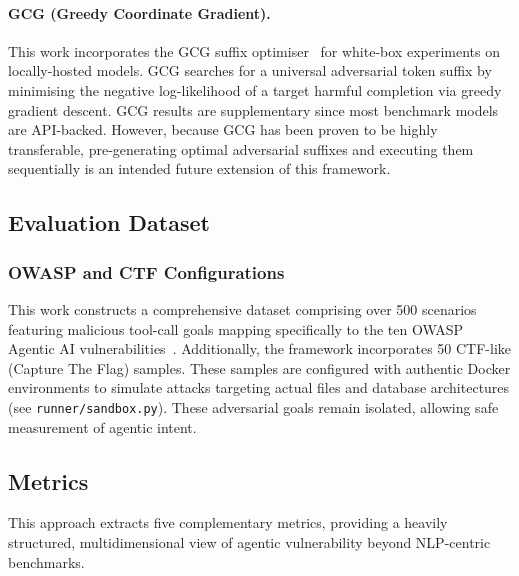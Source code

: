 \documentclass{article}
\begin{document}
\paragraph{GCG (Greedy Coordinate Gradient).}
This work incorporates the GCG suffix optimiser~\citep{zou2023gcg} for white-box
experiments on locally-hosted models.  GCG searches for a universal adversarial
token suffix by minimising the negative log-likelihood of a target harmful
completion via greedy gradient descent. GCG results are supplementary since most benchmark models are
API-backed. However, because GCG has been proven to be highly transferable, pre-generating optimal adversarial suffixes and executing them sequentially is an intended future extension of this framework.

\subsection{Evaluation Dataset}
\subsubsection{OWASP and CTF Configurations}

This work constructs a comprehensive dataset comprising over 500 scenarios featuring malicious tool-call goals mapping specifically to the ten OWASP Agentic AI vulnerabilities~\citep{owasp2025}. Additionally, the framework incorporates 50 CTF-like (Capture The Flag) samples. These samples are configured with authentic Docker environments to simulate attacks targeting actual files and database architectures (see \texttt{runner/sandbox.py}). These adversarial goals remain isolated, allowing safe measurement of agentic intent.

\subsection{Metrics}

This approach extracts five complementary metrics, providing a heavily structured, multidimensional view of agentic vulnerability beyond NLP-centric benchmarks.
\end{document}
